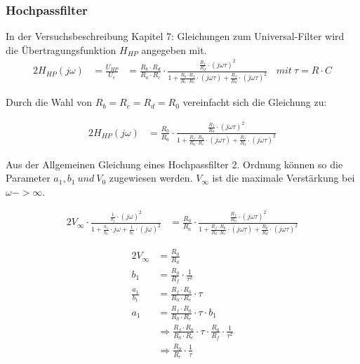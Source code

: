 \newpage


\subsubsection{Hochpassfilter}

In der Versuchsbeschreibung \cite{Aufgabenstellung} Kapitel 7: Gleichungen zum Universal-Filter wird die Übertragungsfunktion $H_{HP}$ angegeben mit.\\

\begin{alignat}{2}
H_{HP} (j \omega)&= \frac{U_{HP}}{U_{e}} &= \frac{R_{b} \cdot R_{d}}{R_{a} \cdot R_{c}} \cdot \frac{ \frac{R_{f} }{R_{d}} \cdot \left( j \omega \tau \right)^2 }{1+\frac{R_{b} \cdot R_{f}}{R_{c} \cdot R_{e}} \cdot  \left(j \omega \tau \right) + \frac{R_{f}}{R_{d}} \cdot \left ( j \omega \tau \right)^2}~~~~ mit ~\tau = R \cdot C
\end{alignat}

\noindent Durch die Wahl von $R_{b} = R_{c} = R_{d} = R_{0}$ vereinfacht sich die Gleichung zu:

\begin{alignat}{2}
H_{HP} (j \omega) &= \frac{R_{0}}{R_{a}} \cdot \frac{ 	\frac{R_{f} }{R_{d}} \cdot \left( j \omega \tau \right)^2 }	 {1+\frac{R_{f} \cdot R_{0}}{R_{0} \cdot R_{e}} \cdot  \left(j \omega \tau \right) + \frac{R_{f}}{R_{0}} \cdot \left ( j \omega \tau \right)^2}
\end{alignat}

\noindent Aus der Allgemeinen Gleichung eines Hochpassfilter 2. Ordnung können so die Parameter $a_{1}, b_{1}~und~V_{0}$ zugewiesen werden. $V_{\infty}$ ist die maximale Verstärkung bei $\omega -> \infty$.

\begin{alignat}{2}
V_{\infty} \cdot \frac{ \frac{1}{b_{1}} \cdot (j \omega)^2}{1 + \frac{a_{1}}{b_{1}} \cdot j \omega + \frac{1}{b_{1}} \cdot \left ( j \omega \right)^2} &= \frac{R_{0}}{R_{a}} \cdot \frac{ \frac{R_{f} }{R_{0}} \cdot \left( j \omega \tau \right)^2  }{1+\frac{R_{f} \cdot R_{0}}{R_{0} \cdot R_{e}} \cdot  \left(j \omega \tau \right) + \frac{R_{0}}{R_{d}} \cdot \left ( j \omega \tau \right)^2}
\end{alignat}

\begin{alignat}{2}
V_{\infty} &= \frac{R_{0}}{R_{a}}\\
b_{1} &= \frac{R_{0}}{R_{f}} \cdot \frac{1}{\tau^2}\\
\frac{a_{1}}{b_{1}} &= \frac{R_{f} \cdot R_{0}}{R_{0} \cdot R_{e}} \cdot \tau\\
a_{1} &= \frac{R_{f} \cdot R_{0}}{R_{0} \cdot R_{e} } \cdot \tau \cdot b_{1}\\
&\Rightarrow \frac{R_{f} \cdot R_{0}}{R_{0} \cdot R_{e} } \cdot \tau \cdot \frac{R_{0}}{R_{f}} \cdot \frac{1}{\tau^2}\\
&\Rightarrow \frac{R_{0}}{R_{e}} \cdot \frac{1}{\tau}
\end{alignat}

